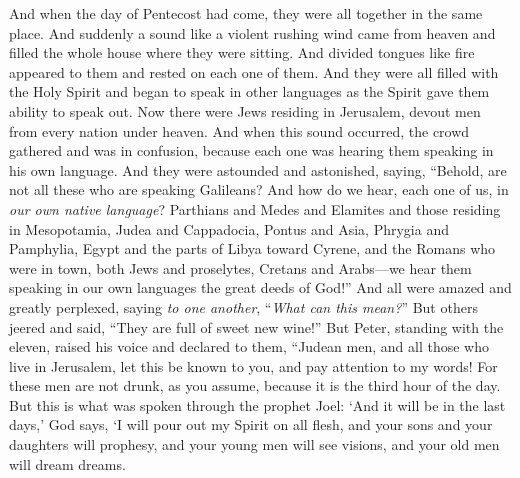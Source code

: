 \begin{biblechapter} %
 And when the day of Pentecost had come, they were all together in the same place.
\verse And suddenly a sound like a violent rushing wind came from heaven and filled the whole house where they were sitting.
\verse And divided tongues like fire appeared to them and rested on each one of them.
\verse And they were all filled with the Holy Spirit and began to speak in other languages as the Spirit gave them ability to speak out.
\verse Now there were Jews residing in Jerusalem, devout men from every nation under heaven.
\verse And when this sound occurred, the crowd gathered and was in confusion, because each one was hearing them speaking in his own language.
\verse And they were astounded and astonished, saying, “Behold, are not all these who are speaking Galileans?
\verse And how do we hear, each one of us, in \textit{our own native language}?
\verse Parthians and Medes and Elamites and those residing in Mesopotamia, Judea and Cappadocia, Pontus and Asia,
\verse Phrygia and Pamphylia, Egypt and the parts of Libya toward Cyrene, and the Romans who were in town,
\verse both Jews and proselytes, Cretans and Arabs—we hear them speaking in our own languages the great deeds of God!”
\verse And all were amazed and greatly perplexed, saying \textit{to one another}, “\textit{What can this mean?}”
\verse But others jeered and said, “They are full of sweet new wine!”
 But Peter, standing with the eleven, raised his voice and declared to them, “Judean men, and all those who live in Jerusalem, let this be known to you, and pay attention to my words!
\verse For these men are not drunk, as you assume, because it is the third hour of the day.
\verse But this is what was spoken through the prophet Joel:
\verse ‘And it will be in the last days,’ God says, 
‘I will pour out my Spirit on all flesh, 
and your sons and your daughters will prophesy, 
and your young men will see visions, 
and your old men will dream dreams.

\end{biblechapter}
